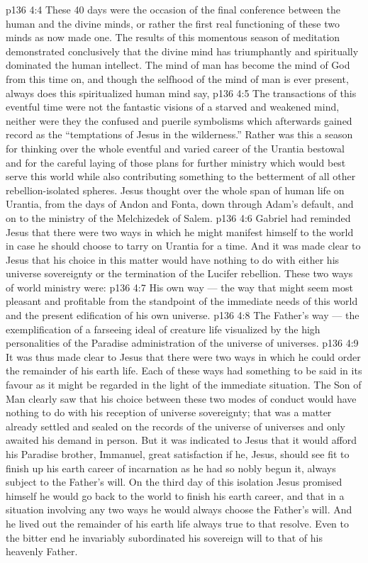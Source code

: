 \vs p136 4:4 \pc These 40 days were the occasion of the final conference between the human and the divine minds, or rather the first real functioning of these two minds as now made one. The results of this momentous season of meditation demonstrated conclusively that the divine mind has triumphantly and spiritually dominated the human intellect. The mind of man has become the mind of God from this time on, and though the selfhood of the mind of man is ever present, always does this spiritualized human mind say, 
\vs p136 4:5 The transactions of this eventful time were not the fantastic visions of a starved and weakened mind, neither were they the confused and puerile symbolisms which afterwards gained record as the “temptations of Jesus in the wilderness.” Rather was this a season for thinking over the whole eventful and varied career of the Urantia bestowal and for the careful laying of those plans for further ministry which would best serve this world while also contributing something to the betterment of all other rebellion\hyp{}isolated spheres. Jesus thought over the whole span of human life on Urantia, from the days of Andon and Fonta, down through Adam’s default, and on to the ministry of the Melchizedek of Salem.
\vs p136 4:6 Gabriel had reminded Jesus that there were two ways in which he might manifest himself to the world in case he should choose to tarry on Urantia for a time. And it was made clear to Jesus that his choice in this matter would have nothing to do with either his universe sovereignty or the termination of the Lucifer rebellion. These two ways of world ministry were:
\vs p136 4:7 \bibnobreakspace His own way --- the way that might seem most pleasant and profitable from the standpoint of the immediate needs of this world and the present edification of his own universe.
\vs p136 4:8 \bibnobreakspace The Father’s way --- the exemplification of a farseeing ideal of creature life visualized by the high personalities of the Paradise administration of the universe of universes.
\vs p136 4:9 It was thus made clear to Jesus that there were two ways in which he could order the remainder of his earth life. Each of these ways had something to be said in its favour as it might be regarded in the light of the immediate situation. The Son of Man clearly saw that his choice between these two modes of conduct would have nothing to do with his reception of universe sovereignty; that was a matter already settled and sealed on the records of the universe of universes and only awaited his demand in person. But it was indicated to Jesus that it would afford his Paradise brother, Immanuel, great satisfaction if he, Jesus, should see fit to finish up his earth career of incarnation as he had so nobly begun it, always subject to the Father’s will. On the third day of this isolation Jesus promised himself he would go back to the world to finish his earth career, and that in a situation involving any two ways he would always choose the Father’s will. And he lived out the remainder of his earth life always true to that resolve. Even to the bitter end he invariably subordinated his sovereign will to that of his heavenly Father.

